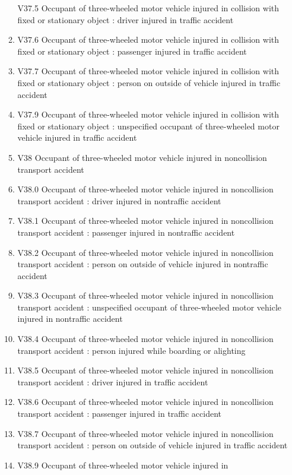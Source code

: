 \documentclass[
]{scrartcl}
\begin{document}
\begin{itemize}
\begin{enumerate}
    V37.5 Occupant of three-wheeled motor vehicle injured in collision
    with fixed or stationary object : driver injured in traffic accident
  \item
    V37.6 Occupant of three-wheeled motor vehicle injured in collision
    with fixed or stationary object : passenger injured in traffic
    accident
  \item
    V37.7 Occupant of three-wheeled motor vehicle injured in collision
    with fixed or stationary object : person on outside of vehicle
    injured in traffic accident
  \item
    V37.9 Occupant of three-wheeled motor vehicle injured in collision
    with fixed or stationary object : unspecified occupant of
    three-wheeled motor vehicle injured in traffic accident
  \item
    V38 Occupant of three-wheeled motor vehicle injured in noncollision
    transport accident
  \item
    V38.0 Occupant of three-wheeled motor vehicle injured in
    noncollision transport accident : driver injured in nontraffic
    accident
  \item
    V38.1 Occupant of three-wheeled motor vehicle injured in
    noncollision transport accident : passenger injured in nontraffic
    accident
  \item
    V38.2 Occupant of three-wheeled motor vehicle injured in
    noncollision transport accident : person on outside of vehicle
    injured in nontraffic accident
  \item
    V38.3 Occupant of three-wheeled motor vehicle injured in
    noncollision transport accident : unspecified occupant of
    three-wheeled motor vehicle injured in nontraffic accident
  \item
    V38.4 Occupant of three-wheeled motor vehicle injured in
    noncollision transport accident : person injured while boarding or
    alighting
  \item
    V38.5 Occupant of three-wheeled motor vehicle injured in
    noncollision transport accident : driver injured in traffic accident
  \item
    V38.6 Occupant of three-wheeled motor vehicle injured in
    noncollision transport accident : passenger injured in traffic
    accident
  \item
    V38.7 Occupant of three-wheeled motor vehicle injured in
    noncollision transport accident : person on outside of vehicle
    injured in traffic accident
  \item
    V38.9 Occupant of three-wheeled motor vehicle injured in

\end{enumerate}
\end{itemize}
\end{document}

